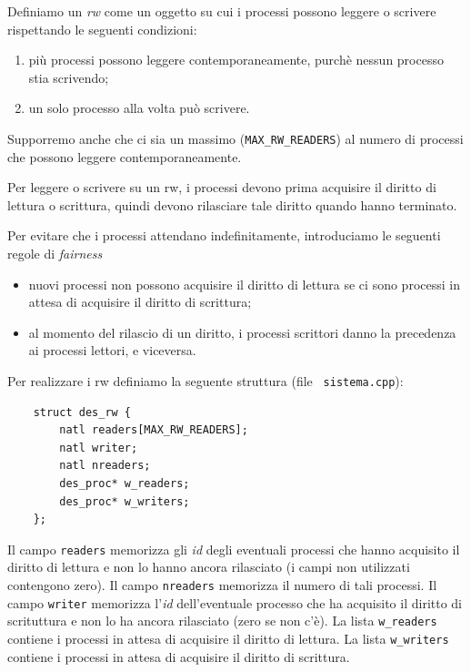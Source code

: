 Definiamo un {\em rw} come un oggetto su cui i processi possono leggere o scrivere
rispettando le seguenti condizioni:
\begin{enumerate}
\item pi\`u processi possono leggere contemporaneamente, purch\`e nessun processo stia scrivendo;
\item un solo processo alla volta pu\`o scrivere.
\end{enumerate}
Supporremo anche che ci sia un massimo (\verb|MAX_RW_READERS|) al numero di processi
che possono leggere contemporaneamente.

Per leggere o scrivere su un rw, i processi devono prima acquisire il diritto di lettura
o scrittura, quindi devono rilasciare tale diritto quando hanno terminato.

Per evitare che i processi attendano indefinitamente, introduciamo le seguenti regole di {\em fairness}
\begin{itemize}
 \item nuovi processi non possono acquisire il diritto di lettura se ci sono processi in attesa
 di acquisire il diritto di scrittura;
 \item al momento del rilascio di un diritto, i processi scrittori danno la precedenza ai processi lettori, e viceversa.
\end{itemize}

Per realizzare i rw definiamo la seguente struttura (file {\tt
sistema.cpp}):

\begin{verbatim}
    struct des_rw {
        natl readers[MAX_RW_READERS];
        natl writer;
        natl nreaders;
        des_proc* w_readers;
        des_proc* w_writers;
    };
\end{verbatim}

Il campo \verb|readers| memorizza gli {\em id} degli eventuali processi che
hanno acquisito il diritto di lettura e non lo hanno ancora rilasciato
(i campi non utilizzati contengono zero).
Il campo \verb|nreaders| memorizza il numero di tali processi.
Il campo \verb|writer| memorizza l'{\em id} dell'eventuale processo che ha acquisito
il diritto di scrituttura e non lo ha ancora rilasciato (zero se non c'\`e).
La lista \verb|w_readers| contiene i processi in attesa di acquisire il diritto di lettura.
La lista \verb|w_writers| contiene i processi in attesa di acquisire il diritto di scrittura.

